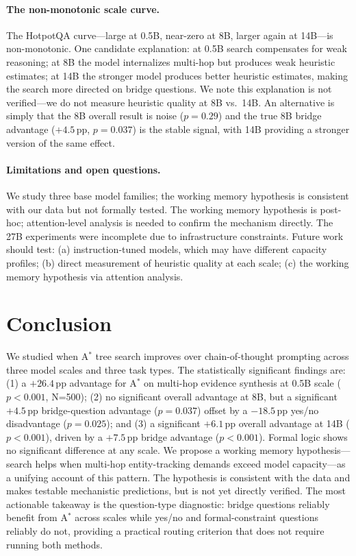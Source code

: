 \documentclass{article}
\newcommand{\astar}{A$^*$\xspace}
\begin{document}
\paragraph{The non-monotonic scale curve.}
The HotpotQA curve---large at 0.5B, near-zero at 8B, larger again at 14B---is non-monotonic.
One candidate explanation: at 0.5B search compensates for weak reasoning; at 8B the model internalizes multi-hop but produces weak heuristic estimates; at 14B the stronger model produces better heuristic estimates, making the search more directed on bridge questions.
We note this explanation is not verified---we do not measure heuristic quality at 8B vs.\ 14B.
An alternative is simply that the 8B overall result is noise ($p=0.29$) and the true 8B bridge advantage ($+4.5$\,pp, $p=0.037$) is the stable signal, with 14B providing a stronger version of the same effect.

\paragraph{Limitations and open questions.}
We study three base model families; the working memory hypothesis is consistent with our data but not formally tested.
The working memory hypothesis is post-hoc; attention-level analysis is needed to confirm the mechanism directly.
The 27B experiments were incomplete due to infrastructure constraints.
Future work should test: (a) instruction-tuned models, which may have different capacity profiles; (b) direct measurement of heuristic quality at each scale; (c) the working memory hypothesis via attention analysis.

\section{Conclusion}
\label{sec:conclusion}

We studied when \astar tree search improves over chain-of-thought prompting across three model scales and three task types.
The statistically significant findings are: (1) a $+26.4$\,pp advantage for \astar on multi-hop evidence synthesis at 0.5B scale ($p<0.001$, N=500); (2) no significant overall advantage at 8B, but a significant $+4.5$\,pp bridge-question advantage ($p=0.037$) offset by a $-18.5$\,pp yes/no disadvantage ($p=0.025$); and (3) a significant $+6.1$\,pp overall advantage at 14B ($p<0.001$), driven by a $+7.5$\,pp bridge advantage ($p<0.001$).
Formal logic shows no significant difference at any scale.
We propose a working memory hypothesis---search helps when multi-hop entity-tracking demands exceed model capacity---as a unifying account of this pattern.
The hypothesis is consistent with the data and makes testable mechanistic predictions, but is not yet directly verified.
The most actionable takeaway is the question-type diagnostic: bridge questions reliably benefit from \astar across scales while yes/no and formal-constraint questions reliably do not, providing a practical routing criterion that does not require running both methods.
\end{document}
